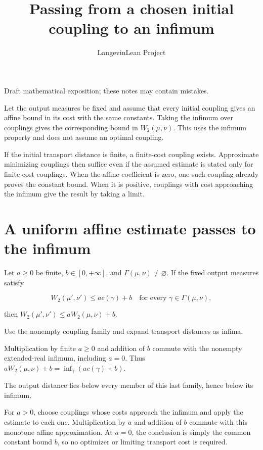 \documentclass[11pt,a4paper]{article}
\title{\texorpdfstring{Passing from a chosen initial coupling to an infimum}{Passing from a chosen initial coupling to an infimum}}
\author{LangevinLean Project}
\date{}
\begin{document}
\maketitle
Draft mathematical exposition; these notes may contain mistakes.


Let the output measures be fixed and assume that every initial coupling gives an affine bound in its cost with the same constants. Taking the infimum over couplings gives the corresponding bound in \(W_2(\mu,\nu)\). This uses the infimum property and does not assume an optimal coupling.



If the initial transport distance is finite, a finite-cost coupling exists. Approximate minimizing couplings then suffice even if the assumed estimate is stated only for finite-cost couplings. When the affine coefficient is zero, one such coupling already proves the constant bound. When it is positive, couplings with cost approaching the infimum give the result by taking a limit.


\section{\texorpdfstring{A uniform affine estimate passes to the infimum}{A uniform affine estimate passes to the infimum}}


Let \(a\ge0\) be finite, \(b\in[0,+\infty]\), and \(\Gamma(\mu,\nu)\ne\varnothing\). If the fixed output measures satisfy

\[W_2(\mu',\nu')\le ac(\gamma)+b\quad\text{for every }\gamma\in\Gamma(\mu,\nu),\]

then \(W_2(\mu',\nu')\le aW_2(\mu,\nu)+b\).



Use the nonempty coupling family and expand transport distances as infima.



Multiplication by finite \(a\ge0\) and addition of \(b\) commute with the nonempty extended-real infimum, including \(a=0\). Thus \(aW_2(\mu,\nu)+b=\inf_\gamma(ac(\gamma)+b)\).



The output distance lies below every member of this last family, hence below its infimum.



For \(a>0\), choose couplings whose costs approach the infimum and apply the estimate to each one. Multiplication by \(a\) and addition of \(b\) commute with this monotone affine approximation. At \(a=0\), the conclusion is simply the common constant bound \(b\), so no optimizer or limiting transport cost is required.
\end{document}
